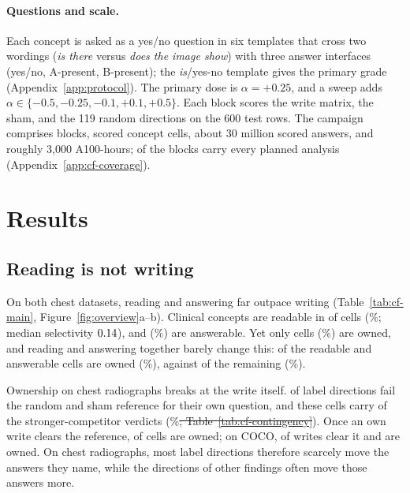 \documentclass{article}
\makeatletter
\providecommand{\DIFdeltex}[1]{{\protect\color{red}\sout{#1}}} %
\providecommand{\DIFdelbegin}{} %
\providecommand{\DIFdelend}{} %
\providecommand{\DIFdel}[1]{\texorpdfstring{\DIFdeltex{#1}}{}} %
\providecommand{\DIFscaledelfig}{0.5}
\newlength{\DIFdelgraphicswidth} %
\newlength{\DIFdelgraphicsheight} %
\providecommand{\DIFdelincludegraphics}[2][]{%
\sbox{\DIFdelgraphicsbox}{\DIFOincludegraphics[#1]{#2}}%
\settoboxwidth{\DIFdelgraphicswidth}{\DIFdelgraphicsbox} %
\settoboxtotalheight{\DIFdelgraphicsheight}{\DIFdelgraphicsbox} %
\scalebox{\DIFscaledelfig}{%
\parbox[b]{\DIFdelgraphicswidth}{\usebox{\DIFdelgraphicsbox}\\[-\baselineskip] \rule{\DIFdelgraphicswidth}{0em}}\llap{\resizebox{\DIFdelgraphicswidth}{\DIFdelgraphicsheight}{%
\setlength{\unitlength}{\DIFdelgraphicswidth}%
\begin{picture}(1,1)%
\thicklines\linethickness{2pt} %
{\color[rgb]{1,0,0}\put(0,0){\framebox(1,1){}}}%
{\color[rgb]{1,0,0}\put(0,0){\line( 1,1){1}}}%
{\color[rgb]{1,0,0}\put(0,1){\line(1,-1){1}}}%
\end{picture}%
}\hspace*{3pt}}} %
} %
\DeclareRobustCommand{\DIFdelbegin}{\DIFOdelbegin \let\includegraphics\DIFdelincludegraphics} %
\DeclareRobustCommand{\DIFdelend}{\DIFOaddend \let\includegraphics\DIFOincludegraphics} %
\let\sout@orig\sout %
\renewcommand{\sout}[1]{\ifmmode\text{\sout@orig{\ensuremath{#1}}}\else\sout@orig{#1}\fi} %
\makeatother
\begin{document}
\paragraph{Questions and scale.}
Each concept is asked as a yes/no question in six templates that cross two wordings (\emph{is there} versus \emph{does the image show}) with three answer interfaces (yes/no, A-present, B-present); the \emph{is}/yes-no template gives the primary grade (Appendix~\ref{app:protocol}). The primary dose is $\alpha=+0.25$, and a sweep adds $\alpha\in\{-0.5,-0.25,-0.1,+0.1,+0.5\}$. Each block scores the write matrix, the sham, and the 119 random directions on the 600 test rows. The campaign comprises \cfBlocks{} blocks, \cfCells{} scored concept cells, about 30 million scored answers, and roughly 3{,}000 A100-hours; \cfCoverageBlocksAllSeven{} of the \cfBlocks{} blocks carry every planned analysis (Appendix~\ref{app:cf-coverage}).

\section{Results}
\label{sec:results}

\subsection{Reading is not writing}
\label{sec:headline}

On both chest datasets, reading and answering far outpace writing (Table~\ref{tab:cf-main}, Figure~\ref{fig:overview}a--b). Clinical concepts are readable in \cfChestReadable{} of \cfChestReadableN{} cells (\cfChestReadablePct\%; median selectivity $0.14$), and \cfChestAnswerable{} (\cfChestAnswerablePct\%) are answerable. Yet only \cfChestOwned{} cells (\cfChestOwnedPct\%) are owned, and reading and answering together barely change this: \cfReadAnsOwned{} of the \cfReadAns{} readable and answerable cells are owned (\cfReadAnsOwnedPct\%), against \cfRestOwned{} of the remaining \cfRestN{} (\cfRestOwnedPct\%).

Ownership on chest radiographs breaks at the write itself. \cfChestRefBelow{} of \cfChestCellsN{} label directions fail the random and sham reference for their own question, and these cells carry \cfChestBelowStrong{} of the \cfChestCompetitor{} stronger-competitor verdicts (\cfChestBelowStrongPct\%\DIFdelbegin \DIFdel{; Table~\ref{tab:cf-contingency}}\DIFdelend ). Once an own write clears the reference, \cfChestOwned{} of \cfChestRefMet{} cells are owned; on COCO, \cfCocoRefMet{} of \cfCocoOwnedN{} writes clear it and \cfCocoOwned{} are owned. On chest radiographs, most label directions therefore scarcely move the answers they name, while the directions of other findings often move those answers more.
\end{document}

